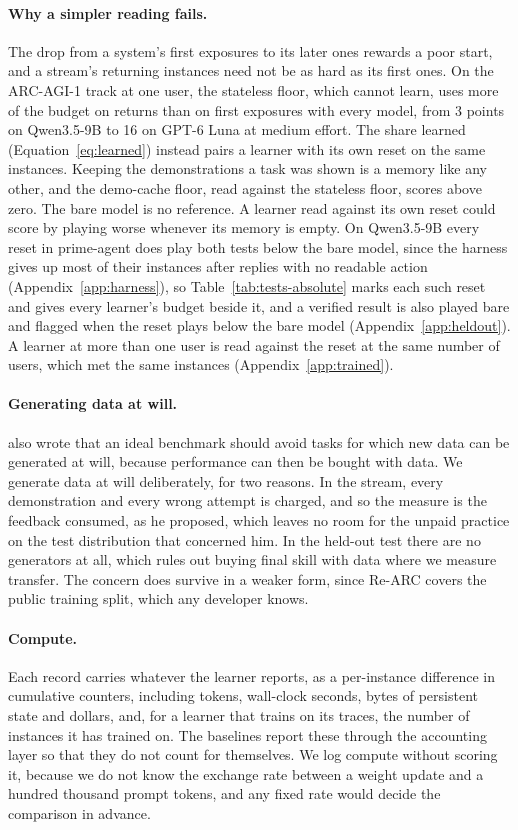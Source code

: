 \paragraph{Why a simpler reading fails.} The drop from a system's first exposures to its later ones rewards a poor start, and a stream's returning instances need not be as hard as its first ones. On the ARC-AGI-1 track at one user, the stateless floor, which cannot learn, uses more of the budget on returns than on first exposures with every model, from 3 points on Qwen3.5-9B to 16 on GPT-6 Luna at medium effort. The share learned (Equation~\ref{eq:learned}) instead pairs a learner with its own reset on the same instances. Keeping the demonstrations a task was shown is a memory like any other, and the demo-cache floor, read against the stateless floor, scores above zero. The bare model is no reference. A learner read against its own reset could score by playing worse whenever its memory is empty. On Qwen3.5-9B every reset in prime-agent does play both tests below the bare model, since the harness gives up most of their instances after replies with no readable action (Appendix~\ref{app:harness}), so Table~\ref{tab:tests-absolute} marks each such reset and gives every learner's budget beside it, and a verified result is also played bare and flagged when the reset plays below the bare model (Appendix~\ref{app:heldout}). A learner at more than one user is read against the reset at the same number of users, which met the same instances (Appendix~\ref{app:trained}).

\paragraph{Generating data at will.} \citet{chollet2019measure} also wrote that an ideal benchmark should avoid tasks for which new data can be generated at will, because performance can then be bought with data. We generate data at will deliberately, for two reasons. In the stream, every demonstration and every wrong attempt is charged, and so the measure is the feedback consumed, as he proposed, which leaves no room for the unpaid practice on the test distribution that concerned him. In the held-out test there are no generators at all, which rules out buying final skill with data where we measure transfer. The concern does survive in a weaker form, since Re-ARC covers the public training split, which any developer knows.

\paragraph{Compute.} Each record carries whatever the learner reports, as a per-instance difference in cumulative counters, including tokens, wall-clock seconds, bytes of persistent state and dollars, and, for a learner that trains on its traces, the number of instances it has trained on. The baselines report these through the accounting layer so that they do not count for themselves. We log compute without scoring it, because we do not know the exchange rate between a weight update and a hundred thousand prompt tokens, and any fixed rate would decide the comparison in advance.
